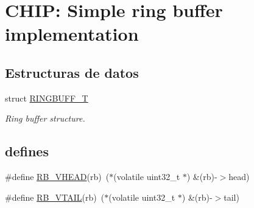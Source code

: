 \hypertarget{group___ring___buffer}{}\section{C\+H\+IP\+: Simple ring buffer implementation}
\label{group___ring___buffer}
\subsection*{Estructuras de datos}
\begin{DoxyCompactItemize}
\item 
struct \hyperlink{struct_r_i_n_g_b_u_f_f___t}{R\+I\+N\+G\+B\+U\+F\+F\+\_\+T}
\begin{DoxyCompactList}\small\item\em Ring buffer structure. \end{DoxyCompactList}\end{DoxyCompactItemize}
\subsection*{\textquotesingle{}defines\textquotesingle{}}
\begin{DoxyCompactItemize}
\item 
\#define \hyperlink{group___ring___buffer_gab0e914e769172c3291a9cc36962bc4de}{R\+B\+\_\+\+V\+H\+E\+AD}(rb)~($\ast$(volatile uint32\+\_\+t $\ast$) \&(rb)-\/$>$head)
\item 
\#define \hyperlink{group___ring___buffer_ga9f7c4d3e3029e8318582a147a5c37674}{R\+B\+\_\+\+V\+T\+A\+IL}(rb)~($\ast$(volatile uint32\+\_\+t $\ast$) \&(rb)-\/$>$tail)
\end{DoxyCompactItemize}
